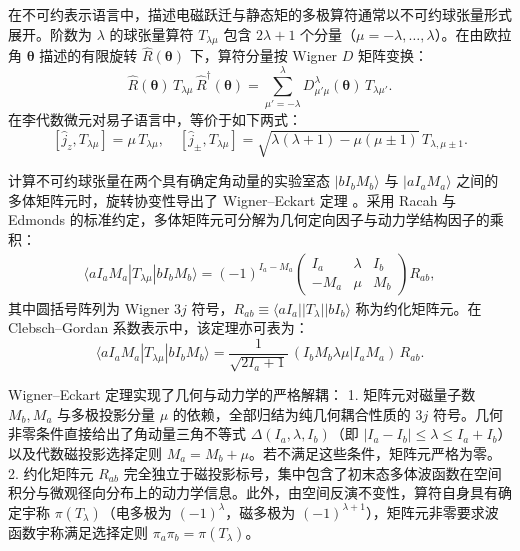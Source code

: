在不可约表示语言中，描述电磁跃迁与静态矩的多极算符通常以不可约球张量形式展开。阶数为 $\lambda$ 的球张量算符 $T_{\lambda\mu}$ 包含 $2\lambda + 1$ 个分量（$\mu = -\lambda, \dots, \lambda$）。在由欧拉角 $\boldsymbol{\theta}$ 描述的有限旋转 $\hat{R}(\boldsymbol{\theta})$ 下，算符分量按 Wigner $D$ 矩阵变换：
\begin{equation}\label{eq:2-1-5}
\hat{R}(\boldsymbol{\theta}) \, T_{\lambda\mu} \, \hat{R}^\dagger(\boldsymbol{\theta}) = \sum_{\mu'=-\lambda}^\lambda D^\lambda_{\mu'\mu}(\boldsymbol{\theta}) \, T_{\lambda\mu'}.
\end{equation}
在李代数微元对易子语言中，等价于如下两式：
\begin{equation}\label{eq:2-1-6}
[\hat{j}_z, T_{\lambda\mu}] = \mu \, T_{\lambda\mu}, \quad [\hat{j}_\pm, T_{\lambda\mu}] = \sqrt{\lambda(\lambda+1) - \mu(\mu \pm 1)} \, T_{\lambda, \mu \pm 1}.
\end{equation}

计算不可约球张量在两个具有确定角动量的实验室态 $|b I_b M_b\rangle$ 与 $|a I_a M_a\rangle$ 之间的多体矩阵元时，旋转协变性导出了 Wigner–Eckart 定理 \cite{book-suhonen-from-nucleons-to-nucleus}。采用 Racah 与 Edmonds 的标准约定，多体矩阵元可分解为几何定向因子与动力学结构因子的乘积：
\begin{align}\label{eq:2-1-7}
\langle a I_a M_a | T_{\lambda\mu} | b I_b M_b \rangle = (-1)^{I_a - M_a} \begin{pmatrix} I_a & \lambda & I_b \\ -M_a & \mu & M_b \end{pmatrix} R_{ab},
\end{align}
其中圆括号阵列为 Wigner $3j$ 符号，$R_{ab} \equiv \langle a I_a || T_\lambda || b I_b \rangle$ 称为约化矩阵元。在 Clebsch–Gordan 系数表示中，该定理亦可表为：
\begin{equation}\label{eq:2-1-8}
\langle a I_a M_a | T_{\lambda\mu} | b I_b M_b \rangle = \frac{1}{\sqrt{2I_a+1}} \, (I_b M_b \lambda \mu | I_a M_a) \, R_{ab}.
\end{equation}

Wigner–Eckart 定理实现了几何与动力学的严格解耦：
1. 矩阵元对磁量子数 $M_b, M_a$ 与多极投影分量 $\mu$ 的依赖，全部归结为纯几何耦合性质的 $3j$ 符号。几何非零条件直接给出了角动量三角不等式 $\Delta(I_a, \lambda, I_b)$（即 $|I_a - I_b| \le \lambda \le I_a + I_b$）以及代数磁投影选择定则 $M_a = M_b + \mu$。若不满足这些条件，矩阵元严格为零。
2. 约化矩阵元 $R_{ab}$ 完全独立于磁投影标号，集中包含了初末态多体波函数在空间积分与微观径向分布上的动力学信息。此外，由空间反演不变性，算符自身具有确定宇称 $\pi(T_\lambda)$（电多极为 $(-1)^\lambda$，磁多极为 $(-1)^{\lambda+1}$），矩阵元非零要求波函数宇称满足选择定则 $\pi_a \pi_b = \pi(T_\lambda)$。

